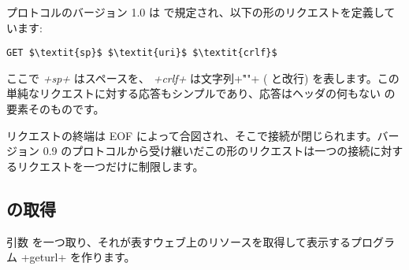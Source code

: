\http プロトコルのバージョン 1.0 は  で規定され、以下の形のリクエストを定義しています:
\begin{lstlisting}
GET $\textit{sp}$ $\textit{uri}$ $\textit{crlf}$
\end{lstlisting}
ここで \textit{\ml+sp+} はスペースを、 \textit{\ml+crlf+} は文字列\ml+"\r\n"+ ( と改行) を表します。この単純なリクエストに対する応答もシンプルであり、応答はヘッダの何もない \URL の要素そのものです。

リクエストの終端は EOF によって合図され、そこで接続が閉じられます。バージョン 0.9 のプロトコルから受け継いだこの形のリクエストは一つの接続に対するリクエストを一つだけに制限します。

\subsection*{{\normalfont\URL} の取得}

引数 \URL を一つ取り、それが表すウェブ上のリソースを取得して表示するプログラム \ml+geturl+ を作ります。

